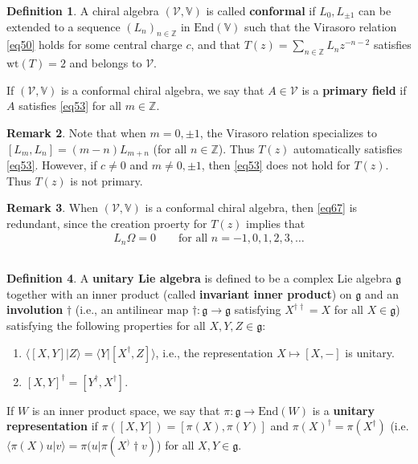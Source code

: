 \documentclass[12pt,b5paper,notitlepage]{article}
\theoremstyle{definition}
\newtheorem{df}{Definition}[section]
\newtheorem{rem}[df]{Remark}
\theoremstyle{plain}
\newcommand{\mc}{\mathcal}
\newcommand{\End}{\mathrm{End}} %
\newcommand{\bk}[1]{\langle {#1}\rangle}
\newcommand{\gk}{\mathfrak g}
\newcommand{\Vbb}{\mathbb V}
\newcommand{\Zbb}{\mathbb Z}
\newcommand{\wt}{\mathrm{wt}}
\numberwithin{equation}{section}
\begin{document}
\begin{df}
A chiral algebra $(\mc V,\Vbb)$ is called \textbf{conformal}  if $L_0,L_{\pm1}$ can be extended to a sequence $(L_n)_{n\in\Zbb}$ in $\End(\Vbb)$ such that the Virasoro relation \eqref{eq50} holds for some central charge $c$, and that $T(z)=\sum_{n\in\Zbb}L_nz^{-n-2}$ satisfies $\wt(T)=2$ and belongs to $\mc V$.

If $(\mc V,\Vbb)$ is a conformal chiral algebra, we say that $A\in \mc V$ is a \textbf{primary field}  if $A$ satisfies \eqref{eq53} for all $m\in\Zbb$. \hfill\qedsymbol
\end{df}

\begin{rem}
Note that when $m=0,\pm 1$, the Virasoro relation specializes to $[L_m,L_n]=(m-n)L_{m+n}$ (for all $n\in\Zbb$). Thus $T(z)$ automatically satisfies \eqref{eq53}. However, if $c\neq 0$ and $m\neq 0,\pm1$, then \eqref{eq53} does not hold for $T(z)$. Thus $T(z)$ is not primary.
\end{rem}


\begin{rem}
When $(\mc V,\Vbb)$ is a conformal chiral algebra, then \eqref{eq67} is redundant, since the creation proerty for $T(z)$ implies that
\begin{align*}
L_n\Omega=0\qquad\text{for all }n=-1,0,1,2,3,\dots
\end{align*}
\end{rem}


\subsection{}


\begin{df}
A \textbf{unitary Lie algebra}   is defined to be a complex Lie algebra $\gk$ together with an inner product (called \textbf{invariant inner product})  on $\gk$ and an \textbf{involution}  $\dagger$ (i.e., an antilinear map $\dagger:\gk\rightarrow\gk$ satisfying $X^{\dagger\dagger}=X$ for all $X\in\gk$) satisfying the following properties for all $X,Y,Z\in\gk$:
\begin{enumerate}[label=(\arabic*)]
\item $\bk{[X,Y]|Z}=\bk{Y|[X^\dagger,Z]}$, i.e., the representation $X\mapsto [X,-]$ is unitary.
\item $[X,Y]^\dagger=[Y^\dagger,X^\dagger]$.
\end{enumerate}
If $W$ is an inner product space, we say that $\pi:\gk\rightarrow\End(W)$ is a \textbf{unitary representation} if $\pi([X,Y])=[\pi(X),\pi(Y)]$ and $\pi(X)^\dagger=\pi(X^\dagger)$ (i.e. $\bk{\pi(X)u|v}=\pi(u|\pi(X^)\dagger v)$) for all $X,Y\in\gk$. 
\end{df}
\end{document}
